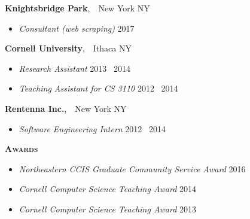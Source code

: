 \documentclass{article}
\newcommand{\mysection}[1]{\vspace{0.5cm}
\hspace{-1.3cm}\textsc{\textbf{#1}}~\hrulefill}
\newcommand{\mysubsection}[1]{\hspace{-10ex}\textbf{#1}}
\begin{document}
\mysubsection{Knightsbridge Park},~~New York NY
\begin{itemize}
\item \emph{Consultant (web scraping)} \hfill 2017
\end{itemize}

\mysubsection{Cornell University},~~Ithaca NY
\begin{itemize}
\item \emph{Research Assistant} \hfill 2013 \textendash\ 2014
\item \emph{Teaching Assistant for CS 3110} \hfill 2012 \textendash\ 2014
\end{itemize}

\mysubsection{Rentenna Inc.},~~New York NY
\begin{itemize}
\item \emph{Software Engineering Intern} \hfill 2012 \textendash\ 2014
\end{itemize}

\newpage
\mysection{Awards} %
\begin{itemize}
\item \emph{Northeastern CCIS Graduate Community Service Award} \hfill 2016
\item \emph{Cornell Computer Science Teaching Award} \hfill 2014
\item \emph{Cornell Computer Science Teaching Award} \hfill 2013
\end{itemize}

\end{document}
